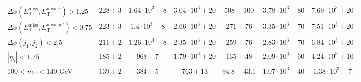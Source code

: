 \begin{table}[h!]
\begin{tabular}{lcccccc}
$\Delta\phi(E_{\mathrm{T}}^{\mathrm{miss}},E_{\mathrm{T}}^{\mathrm{miss},\gamma})>1.25$ &$228 \pm 3$ &  $1.64\cdot 10^{3} \pm 8$ & $3.04\cdot 10^{3} \pm 20$ & $508 \pm 100$ & $3.78\cdot 10^{3} \pm 80$ & $7.69\cdot 10^{3} \pm 20$ \\
$\Delta\phi(E_{\mathrm{T}}^{\mathrm{miss}},E_{\mathrm{T}}^{\mathrm{miss},jet})<0.75$ & $223 \pm 3$ & $1.4\cdot 10^{3} \pm 8$ & $2.66\cdot 10^{3} \pm 20$ & $271 \pm 76$ & $3.35\cdot 10^{3} \pm 70$ & $7.51\cdot 10^{3} \pm 20$ \\
$\Delta\phi(j_1,j_2)<2.5$ & $211 \pm 2$ & $1.26\cdot 10^{3} \pm 8$ & $2.35\cdot 10^{3} \pm 20$ & $259 \pm 76$ & $2.83\cdot 10^{3} \pm 70$ & $6.84\cdot 10^{3} \pm 20$ \\
$|\eta_{\gamma}|<1.75$ & $185 \pm 2$ & $968 \pm 7$ & $1.79\cdot 10^{3} \pm 20$ & $135 \pm 48$ & $2.09\cdot 10^{3} \pm 60$ & $4.24\cdot 10^{3} \pm 10$ \\
$100 < m_{\mathrm{T}} < 140$ GeV &$139 \pm 2$ & $384 \pm 5$ & $763 \pm 13$ & $94.8 \pm 43.1$ & $1.07\cdot 10^{3} \pm 40$ & $1.38\cdot 10^{3} \pm 7$ \\
\hline

\end{tabular}

\end{table}
